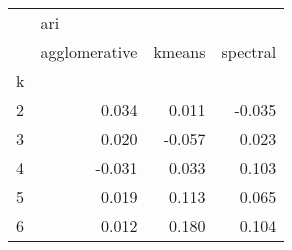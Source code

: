 \begin{tabular}{lrrr}
\toprule
{} & \multicolumn{3}{l}{ari} \\
{} & agglomerative & kmeans & spectral \\
k &               &        &          \\
\midrule
2 &         0.034 &  0.011 &   -0.035 \\
3 &         0.020 & -0.057 &    0.023 \\
4 &        -0.031 &  0.033 &    0.103 \\
5 &         0.019 &  0.113 &    0.065 \\
6 &         0.012 &  0.180 &    0.104 \\
\bottomrule
\end{tabular}
